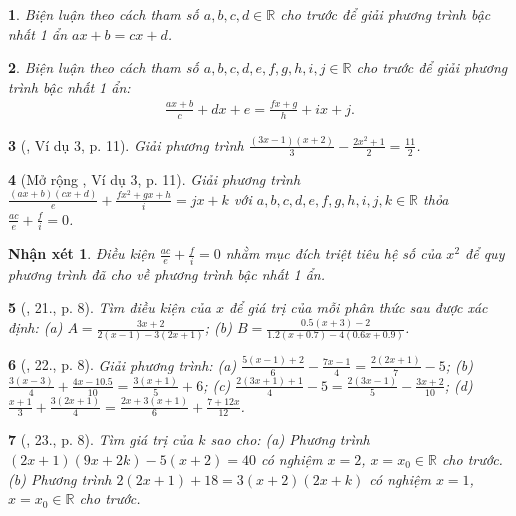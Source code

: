 \documentclass{article}
\newtheorem{baitoan}{}
\newtheorem{nhanxet}{Nhận xét}
\begin{document}
\begin{baitoan}
	Biện luận theo cách tham số $a,b,c,d\in\mathbb{R}$ cho trước để giải phương trình bậc nhất 1 ẩn $ax + b = cx + d$.
\end{baitoan}

\begin{baitoan}
	Biện luận theo cách tham số $a,b,c,d,e,f,g,h,i,j\in\mathbb{R}$ cho trước để giải phương trình bậc nhất 1 ẩn:
	\begin{align*}
		\frac{ax + b}{c} + dx + e = \frac{fx + g}{h} + ix + j.
	\end{align*}
\end{baitoan}

\begin{baitoan}[\cite{SGK_Toan_8_tap_2}, Ví dụ 3, p. 11]
	Giải phương trình $\frac{(3x - 1)(x + 2)}{3} - \frac{2x^2 + 1}{2} = \frac{11}{2}$.
\end{baitoan}

\begin{baitoan}[Mở rộng \cite{SGK_Toan_8_tap_2}, Ví dụ 3, p. 11]
	Giải phương trình $\frac{(ax + b)(cx + d)}{e} + \frac{fx^2 + gx + h}{i} = jx + k$ với $a,b,c,d,e,f,g,h,i,j,k\in\mathbb{R}$ thỏa $\frac{ac}{e} + \frac{f}{i} = 0$.
\end{baitoan}

\begin{nhanxet}
	Điều kiện $\frac{ac}{e} + \frac{f}{i} = 0$ nhằm mục đích triệt tiêu hệ số của $x^2$ để quy phương trình đã cho về phương trình bậc nhất 1 ẩn.
\end{nhanxet}

\begin{baitoan}[\cite{SBT_Toan_8_tap_2}, 21., p. 8]
	Tìm điều kiện của $x$ để giá trị của mỗi phân thức sau được xác định: (a) $A = \frac{3x + 2}{2(x - 1) - 3(2x + 1)}$; (b) $B = \frac{0.5(x + 3) - 2}{1.2(x + 0.7) - 4(0.6x + 0.9)}$.
\end{baitoan}

\begin{baitoan}[\cite{SBT_Toan_8_tap_2}, 22., p. 8]
	Giải phương trình: (a) $\frac{5(x - 1) + 2}{6} - \frac{7x - 1}{4} = \frac{2(2x + 1)}{7} - 5$; (b) $\frac{3(x - 3)}{4} + \frac{4x - 10.5}{10} = \frac{3(x + 1)}{5} + 6$; (c) $\frac{2(3x + 1) + 1}{4} - 5 = \frac{2(3x - 1)}{5} - \frac{3x + 2}{10}$; (d) $\frac{x + 1}{3} + \frac{3(2x + 1)}{4} = \frac{2x + 3(x + 1)}{6} + \frac{7 + 12x}{12}$.
\end{baitoan}

\begin{baitoan}[\cite{SBT_Toan_8_tap_2}, 23., p. 8]
	Tìm giá trị của $k$ sao cho: (a) Phương trình $(2x + 1)(9x + 2k) - 5(x + 2) = 40$ có nghiệm $x = 2$, $x = x_0\in\mathbb{R}$ cho trước. (b) Phương trình $2(2x + 1) + 18 = 3(x + 2)(2x + k)$ có nghiệm $x = 1$, $x = x_0\in\mathbb{R}$ cho trước.
\end{baitoan}
\end{document}
